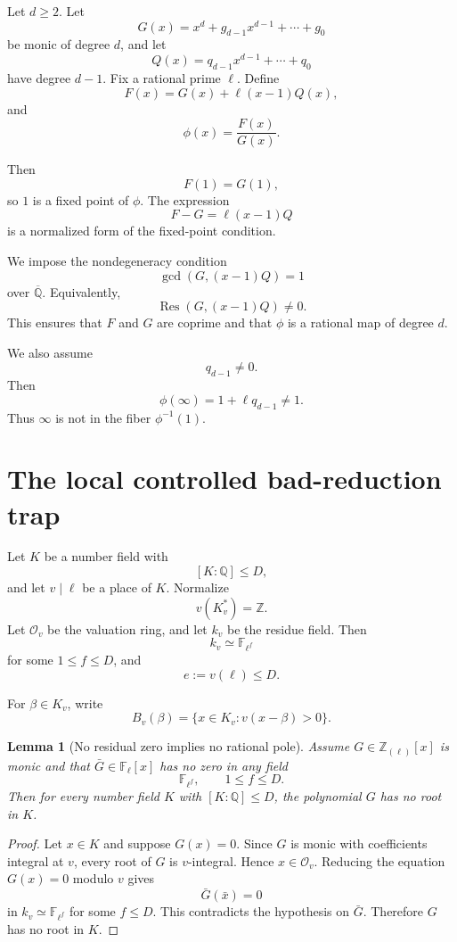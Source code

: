\documentclass[11pt]{article}
\newtheorem{lemma}[theorem]{Lemma}
\begin{document}
Let \(d\ge2\). Let
\[
G(x)=x^d+g_{d-1}x^{d-1}+\cdots+g_0
\]
be monic of degree \(d\), and let
\[
Q(x)=q_{d-1}x^{d-1}+\cdots+q_0
\]
have degree \(d-1\). Fix a rational prime \(\ell\). Define
\[
F(x)=G(x)+\ell(x-1)Q(x),
\]
and
\[
\phi(x)=\frac{F(x)}{G(x)}.
\]

Then
\[
F(1)=G(1),
\]
so \(1\) is a fixed point of \(\phi\). The expression
\[
F-G=\ell(x-1)Q
\]
is a normalized form of the fixed-point condition.

We impose the nondegeneracy condition
\[
\gcd(G,(x-1)Q)=1
\]
over \(\overline{\mathbb Q}\). Equivalently,
\[
\operatorname{Res}(G,(x-1)Q)\ne0.
\]
This ensures that \(F\) and \(G\) are coprime and that \(\phi\) is a rational map of degree \(d\).

We also assume
\[
q_{d-1}\ne0.
\]
Then
\[
\phi(\infty)=1+\ell q_{d-1}\ne1.
\]
Thus \(\infty\) is not in the fiber \(\phi^{-1}(1)\).

\section{The local controlled bad-reduction trap}

Let \(K\) be a number field with
\[
[K:\mathbb Q]\le D,
\]
and let \(v\mid\ell\) be a place of \(K\). Normalize
\[
v(K_v^\ast)=\mathbb Z.
\]
Let \(\mathcal O_v\) be the valuation ring, and let \(k_v\) be the residue field. Then
\[
k_v\simeq \mathbb F_{\ell^f}
\]
for some \(1\le f\le D\), and
\[
e:=v(\ell)\le D.
\]

For \(\beta\in K_v\), write
\[
B_v(\beta)=\{x\in K_v:v(x-\beta)>0\}.
\]

\begin{lemma}[No residual zero implies no rational pole]
Assume \(G\in\mathbb Z_{(\ell)}[x]\) is monic and that \(\bar G\in\mathbb F_\ell[x]\) has no zero in any field
\[
\mathbb F_{\ell^f},
\qquad
1\le f\le D.
\]
Then for every number field \(K\) with \([K:\mathbb Q]\le D\), the polynomial \(G\) has no root in \(K\).
\end{lemma}

\begin{proof}
Let \(x\in K\) and suppose \(G(x)=0\). Since \(G\) is monic with coefficients integral at \(v\), every root of \(G\) is \(v\)-integral. Hence \(x\in\mathcal O_v\). Reducing the equation \(G(x)=0\) modulo \(v\) gives
\[
\bar G(\bar x)=0
\]
in \(k_v\simeq\mathbb F_{\ell^f}\) for some \(f\le D\). This contradicts the hypothesis on \(\bar G\). Therefore \(G\) has no root in \(K\).
\end{proof}
\end{document}
